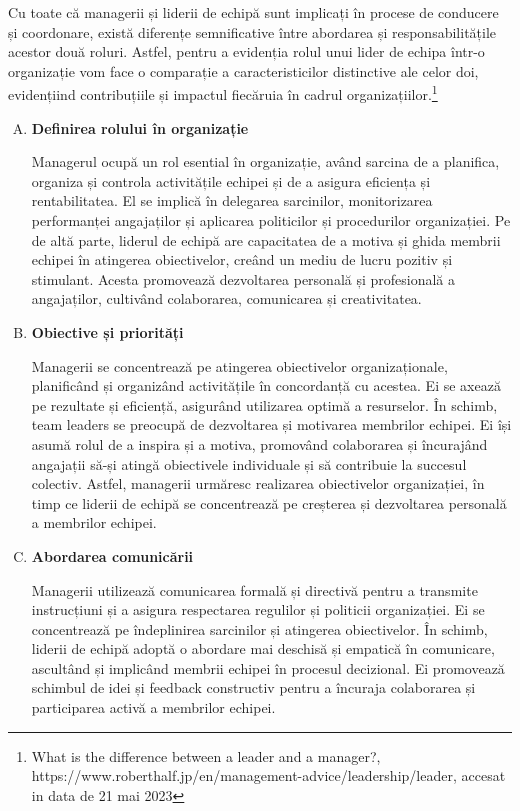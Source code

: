 \documentclass[a4paper, 12pt]{article}
\begin{document}
	\quad Cu toate că managerii și liderii de echipă sunt implicați în procese de conducere și coordonare, există diferențe semnificative între abordarea și responsabilitățile acestor două roluri. Astfel, pentru a evidenția rolul unui lider de echipa într-o organizație vom face o comparație a caracteristicilor distinctive ale celor doi, evidențiind contribuțiile și impactul fiecăruia în cadrul organizațiilor.\footnote{What is the difference between a leader and a manager?, https://www.roberthalf.jp/en/management-advice/leadership/leader, accesat in data de 21 mai 2023}

	\begin{enumerate}[A)]

		\item\textbf{Definirea rolului în organizație}
		
		\quad Managerul ocupă un rol esential în organizație, având sarcina de a planifica, organiza și controla activitățile echipei și de a asigura eficiența și rentabilitatea. El se implică în delegarea sarcinilor, monitorizarea performanței angajaților și aplicarea politicilor și procedurilor organizației. Pe de altă parte, liderul de echipă are capacitatea de a motiva și ghida membrii echipei în atingerea obiectivelor, creând un mediu de lucru pozitiv și stimulant. Acesta promovează dezvoltarea personală și profesională a angajaților, cultivând colaborarea, comunicarea și creativitatea.

		\item \textbf{Obiective și priorități}

		\quad\quad Managerii se concentrează pe atingerea obiectivelor organizaționale, planificând și organizând activitățile în concordanță cu acestea. Ei se axează pe rezultate și eficiență, asigurând utilizarea optimă a resurselor. În schimb, team leaders se preocupă de dezvoltarea și motivarea membrilor echipei. Ei își asumă rolul de a inspira și a motiva, promovând colaborarea și încurajând angajații să-și atingă obiectivele individuale și să contribuie la succesul colectiv. Astfel, managerii urmăresc realizarea obiectivelor organizației, în timp ce liderii de echipă se concentrează pe creșterea și dezvoltarea personală a membrilor echipei.

		\item \textbf{Abordarea comunicării}
		
		\quad\quad Managerii utilizează comunicarea formală și directivă pentru a transmite instrucțiuni și a asigura respectarea regulilor și politicii organizației. Ei se concentrează pe îndeplinirea sarcinilor și atingerea obiectivelor. În schimb, liderii de echipă adoptă o abordare mai deschisă și empatică în comunicare, ascultând și implicând membrii echipei în procesul decizional. Ei promovează schimbul de idei și feedback constructiv pentru a încuraja colaborarea și participarea activă a membrilor echipei.


\end{enumerate}
\end{document}
